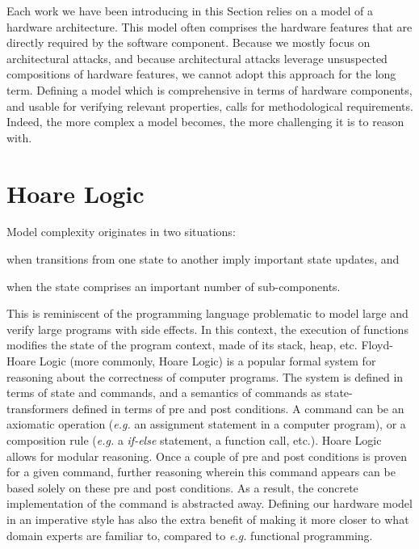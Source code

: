 Each work we have been introducing in this Section relies on a model of a
hardware architecture.
%
This model often comprises the hardware features that are directly required by
the software component.
%
Because we mostly focus on architectural attacks, and because architectural
attacks leverage unsuspected compositions of hardware features, we cannot adopt
this approach for the long term.
%
Defining a model which is comprehensive in terms of hardware components, and
usable for verifying relevant properties, calls for methodological requirements.
%
Indeed, the more complex a model becomes, the more challenging it is to reason
with.

\section{Hoare Logic} %
\label{sec:related:hoare}

Model complexity originates in two situations:
%
\begin{inparaenum}[(1)]
\item when transitions from one state to another imply important state updates,
  and
%
\item when the state comprises an important number of sub-components.
%
\end{inparaenum}
%
This is reminiscent of the programming language problematic to model large and
verify large programs with side effects.
%
In this context, the execution of functions modifies the state of the program
context, made of its stack, heap, etc.
%
Floyd-Hoare Logic (more commonly, Hoare Logic) is a popular formal system for
reasoning about the correctness of computer programs.
%
The system is defined in terms of state and commands, and a semantics of
commands as state-transformers defined in terms of pre and post conditions.
%
A command can be an axiomatic operation (\emph{e.g.} an assignment statement in
a computer program), or a composition rule (\emph{e.g.} a \emph{if-else}
statement, a function call, etc.).
%
Hoare Logic allows for modular reasoning.
%
Once a couple of pre and post conditions is proven for a given command, further
reasoning wherein this command appears can be based solely on these pre and post
conditions.
%
As a result, the concrete implementation of the command is abstracted away.
%
Defining our hardware model in an imperative style has also the extra benefit of
making it more closer to what domain experts are familiar to, compared to
\emph{e.g.} functional programming.

